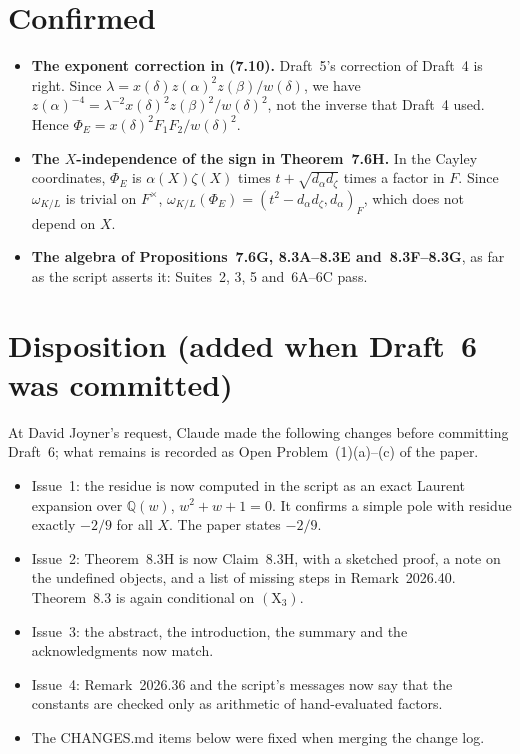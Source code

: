 \documentclass[12pt,letterpaper]{article}
\begin{document}
\section*{Confirmed}

\begin{itemize}[leftmargin=1.5em]
\item \textbf{The exponent correction in (7.10).} Draft~5's correction of
Draft~4 is right. Since $\lambda=x(\delta)z(\alpha)^2z(\beta)/w(\delta)$, we
have $z(\alpha)^{-4}=\lambda^{-2}x(\delta)^2z(\beta)^2/w(\delta)^2$, not the
inverse that Draft~4 used. Hence $\Phi_E=x(\delta)^2F_1F_2/w(\delta)^2$.
\item \textbf{The $X$-independence of the sign in Theorem~7.6H.} In the Cayley
coordinates, $\Phi_E$ is $\alpha(X)\zeta(X)$ times $t+\sqrt{d_\alpha d_\zeta}$
times a factor in $F$. Since $\omega_{K/L}$ is trivial on $F^\times$,
$\omega_{K/L}(\Phi_E)=(t^2-d_\alpha d_\zeta,d_\alpha)_F$, which does not depend
on $X$.
\item \textbf{The algebra of Propositions~7.6G, 8.3A--8.3E and~8.3F--8.3G}, as
far as the script asserts it: Suites~2, 3, 5 and~6A--6C pass.
\end{itemize}

\section*{Disposition (added when Draft~6 was committed)}

At David Joyner's request, Claude made the following changes before committing
Draft~6; what remains is recorded as Open Problem~(1)(a)--(c) of the paper.
\begin{itemize}[leftmargin=1.5em]
\item Issue~1: the residue is now computed in the script as an exact Laurent
expansion over $\mathbb Q(w)$, $w^2+w+1=0$. It confirms a simple pole with
residue exactly $-2/9$ for all $X$. The paper states $-2/9$.
\item Issue~2: Theorem~8.3H is now Claim~8.3H, with a sketched proof, a note on
the undefined objects, and a list of missing steps in Remark~2026.40.
Theorem~8.3 is again conditional on $(\mathrm X_3)$.
\item Issue~3: the abstract, the introduction, the summary and the
acknowledgments now match.
\item Issue~4: Remark~2026.36 and the script's messages now say that the
constants are checked only as arithmetic of hand-evaluated factors.
\item The CHANGES.md items below were fixed when merging the change log.
\end{itemize}
\end{document}
